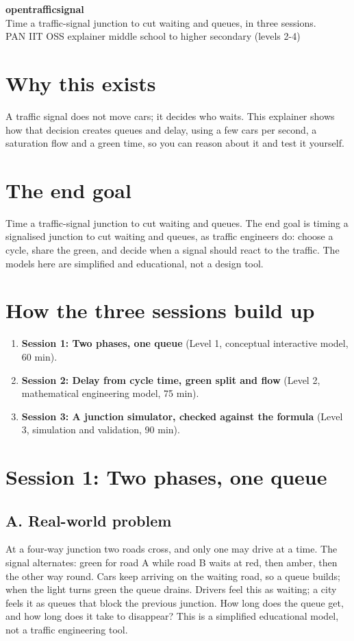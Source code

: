 \documentclass[11pt,a4paper]{article}
\begin{document}
\begin{center}{\LARGE\bfseries opentrafficsignal}\\[0.4em]{\large Time a traffic-signal junction to cut waiting and queues, in three sessions.}\\[0.2em]\small PAN IIT OSS explainer \textbullet{} middle school to higher secondary (levels 2-4)\end{center}

\section*{Why this exists}
A traffic signal does not move cars; it decides who waits. This explainer shows how that decision creates queues and delay, using a few cars per second, a saturation flow and a green time, so you can reason about it and test it yourself.

\section*{The end goal}
Time a traffic-signal junction to cut waiting and queues. The end goal is timing a signalised junction to cut waiting and queues, as traffic engineers do: choose a cycle, share the green, and decide when a signal should react to the traffic. The models here are simplified and educational, not a design tool.

\section*{How the three sessions build up}
\begin{enumerate}[nosep]
\item \textbf{Session 1: Two phases, one queue} (Level 1, conceptual interactive model, 60 min).
\item \textbf{Session 2: Delay from cycle time, green split and flow} (Level 2, mathematical engineering model, 75 min).
\item \textbf{Session 3: A junction simulator, checked against the formula} (Level 3, simulation and validation, 90 min).
\end{enumerate}

\section{Session 1: Two phases, one queue}

\subsection*{A. Real-world problem}
At a four-way junction two roads cross, and only one may drive at a time. The signal alternates: green for road A while road B waits at red, then amber, then the other way round. Cars keep arriving on the waiting road, so a queue builds; when the light turns green the queue drains. Drivers feel this as waiting; a city feels it as queues that block the previous junction. How long does the queue get, and how long does it take to disappear? This is a simplified educational model, not a traffic engineering tool.
\end{document}
